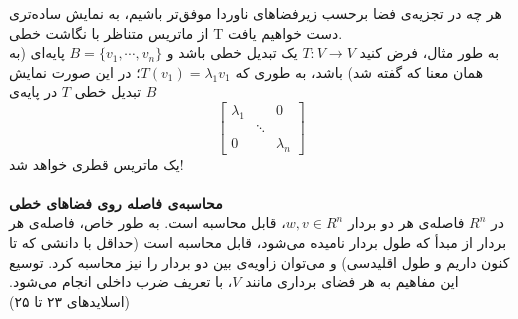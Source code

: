 هر چه در تجزیه‌ی فضا برحسب زیرفضاهای ناوردا موفق‌تر باشیم، به نمایش ساده‌تری از ماتریس متناظر با نگاشت خطی T دست خواهیم یافت.\\
به طور مثال، فرض کنید $T:V\xrightarrow{}V$ یک تبدیل خطی باشد و $B = \{v_{1}, \cdots, v_{n}\}$ پایه‌ای (به همان معنا که گفته شد) باشد، به طوری که $T(v_{1}) = \lambda_{1}v_{1}$؛ در این صورت نمایش تبدیل خطی $T$ در پایه‌‌ی $B$ $$\begin{bmatrix}
\lambda_{1} &&0\\
&\ddots&\\
0 && \lambda_{n}
\end{bmatrix}$$ یک ماتریس قطری خواهد شد!\\\\
\textbf{محاسبه‌ی فاصله روی فضا‌های خطی}\\
در $R^n$ فاصله‌ی هر دو بردار $w,v \in R^n$، قابل محاسبه‌ است. به طور خاص، فاصله‌ی هر بردار از مبدأ که طول بردار نامیده می‌شود، قابل محاسبه است (حداقل با دانشی که تا کنون داریم و طول اقلیدسی) و می‌توان زاویه‌ی بین دو بردار را نیز محاسبه کرد. توسیع این مفاهیم به هر فضا‌ی برداری مانند $V$، با تعریف ضرب داخلی انجام می‌شود. (اسلاید‌های ۲۳ تا ۲۵)











